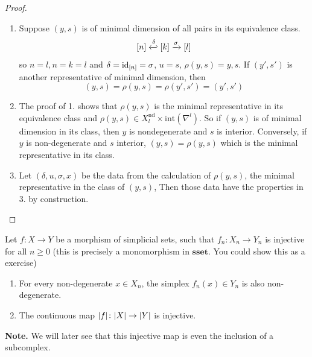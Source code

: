 \documentclass[language=english]{TemplateLecture}
\begin{document}
\begin{proof}
    \begin{enumerate}
        \item Suppose \((y,s)\) is of minimal dimension of all pairs in its equivalence class.
        \[[n] \xhookleftarrow{\delta} [k] \xrightarrow{\sigma} [l]\]
        so \(n = l, n = k= l\) and \(\delta = \operatorname{id}_{[n]} = \sigma\), \(u = s\), \(\rho(y,s) = y,s\). If \((y', s')\) is another representative of minimal dimension, then
        \[(y,s) = \rho(y,s) = \rho(y',s') = (y',s')\]
        \item The proof of 1. shows that \(\rho(y,s)\) is the minimal representative in its equivalence class and \(\rho(y,s) \in X_l^{\text{nd}}\times \mathrm{int}(\nabla^l)\). So if \((y,s)\) is of minimal dimension in its class, then \(y\) is nondegenerate and \(s\) is interior. Conversely, if \(y\) is non-degenerate and \(s\) interior, \((y,s) = \rho(y,s)\) which is the minimal representative in its class.
        \item Let \((\delta, u, \sigma, x)\) be the data from the calculation of \(\rho(y,s)\), the minimal representative in the class of \((y,s)\), Then those data have the properties in 3. by construction.
    \end{enumerate}
\end{proof}


\begin{corollary}
    Let \(f\colon X \to Y\) be a morphism of simplicial sets, such that \(f_n\colon X_n \to Y_n\) is injective for all \(n \geq 0\) (this is precisely a monomorphism in \(\mathbf{sset}\). You could show this as a exercise)
    \begin{enumerate}
        \item For every non-degenerate \(x\in X_n\), the simplex \(f_n(x) \in Y_n\) is also non-degenerate.
        \item The continuous map \(\lvert f\rvert\colon \lvert X\rvert\to \lvert Y\rvert\) is injective.
    \end{enumerate}
\end{corollary}

\textbf{Note.} We will later see that this injective map is even the inclusion of a subcomplex.
\end{document}
